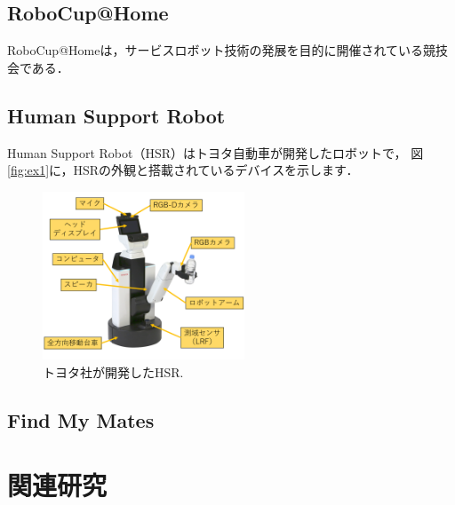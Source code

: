 \documentclass[a4j]{jarticle}
\begin{document}
\subsection{RoboCup@Home}
RoboCup@Homeは，サービスロボット技術の発展を目的に開催されている競技会である．


\subsection{Human Support Robot}
Human Support Robot（HSR）はトヨタ自動車が開発したロボットで，
図\ref{fig:ex1}に，HSRの外観と搭載されているデバイスを示します．

\begin{figure}[ht]
  \centering
  \includegraphics[width=6cm]{images/hsr_explain_ja.png}
  \caption{トヨタ社が開発したHSR.}
  \label{overview_hsr}
\end{figure}

\subsection{Find My Mates}


\section{関連研究}
\end{document}
